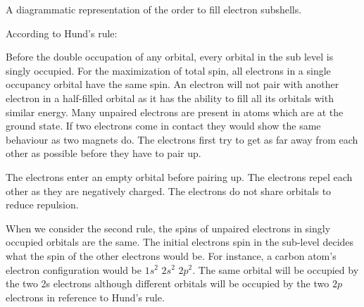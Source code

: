 \begin{chembox}{}
{\begin{center}
\end{center}
A diagrammatic representation of the order to fill electron subshells.}
\end{chembox}
\begin{chembox}{}
{According to Hund’s rule:

Before the double occupation of any orbital, every orbital in the sub level is singly occupied.
For the maximization of total spin, all electrons in a single occupancy orbital have the same spin.
An electron will not pair with another electron in a half-filled orbital as it has the ability to fill all its orbitals with similar energy. Many unpaired electrons are present in atoms which are at the ground state. If two electrons come in contact they would show the same behaviour as two magnets do. The electrons first try to get as far away from each other as possible before they have to pair up.

The electrons enter an empty orbital before pairing up. The electrons repel each other as they are negatively charged. The electrons do not share orbitals to reduce repulsion.

When we consider the second rule, the spins of unpaired electrons in singly occupied orbitals are the same. The initial electrons spin in the sub-level decides what the spin of the other electrons would be. For instance, a carbon atom’s electron configuration would be $1s^2$ $2s^2$ $2p^2$. The same orbital will be occupied by the two 2s electrons although different orbitals will be occupied by the two $2p$ electrons in reference to Hund’s rule.}
\end{chembox}
